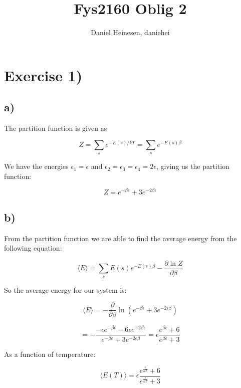 \documentclass[a4paper,norsk, 10pt]{article}
\title{Fys2160 Oblig 2}
\author{Daniel Heinesen, daniehei}
\newcommand{\pd}[2]{\frac{\partial #1}{\partial #2}}
\begin{document}
\maketitle

\section{Exercise 1)}

\subsection{a)}
The partition function is given as

\begin{equation}
Z = \sum_s e^{-E(s)/kT} = \sum_s e^{-E(s)\beta}
\end{equation}\label{eq:partition}

We have the energies $\epsilon_1 = \epsilon$ and $\epsilon_2 = \epsilon_3 = \epsilon_4 = 2\epsilon$, giving us the partition function:

\begin{equation}
Z = e^{-\beta \epsilon} + 3e^{-2\beta \epsilon}
\end{equation}

\subsection{b)}
From the partition function we are able to find the average energy from the following equation:

\begin{equation}
\langle E \rangle = \sum_s E(s) e^{-E(s)\beta} - \pd{\ln Z}{\beta}
\end{equation}\label{eq:magic}

So the average energy for our system is:

\begin{equation}
\langle E \rangle = -\pd{}{\beta} \ln \left(e^{-\beta\epsilon} +3e^{-2\epsilon\beta}\right)
\end{equation}

\begin{equation}
= -\frac{-\epsilon e^{-\beta\epsilon} - 6\epsilon e^{-2\beta\epsilon}}{e^{-\beta\epsilon} +3e^{-2\epsilon\beta}}
= \epsilon\frac{e^{\beta\epsilon} + 6}{e^{\beta\epsilon} +3}
\end{equation}

As a function of temperature:

\begin{equation}
\langle E(T) \rangle = \epsilon\frac{e^{\frac{\epsilon}{kT}} + 6}{e^{\frac{\epsilon}{kT}} +3}
\end{equation}\label{eq:energyDiatomic}
\end{document}
